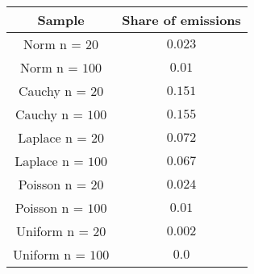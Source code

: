 \begin{tabular}{|c|c|}
\hline
Sample & Share of emissions \\
\hline
Norm n = $20$ & $0.023$\\
\hline
Norm n = $100$ & $0.01$\\
\hline
Cauchy n = $20$ & $0.151$\\
\hline
Cauchy n = $100$ & $0.155$\\
\hline
Laplace n = $20$ & $0.072$\\
\hline
Laplace n = $100$ & $0.067$\\
\hline
Poisson n = $20$ & $0.024$\\
\hline
Poisson n = $100$ & $0.01$\\
\hline
Uniform n = $20$ & $0.002$\\
\hline
Uniform n = $100$ & $0.0$\\
\hline
\end{tabular}